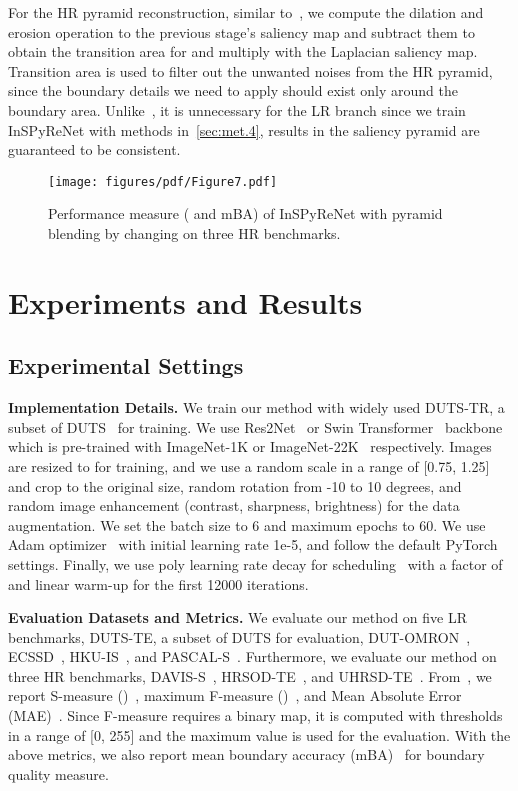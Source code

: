 \documentclass{llncs}
\begin{document}
        For the HR pyramid reconstruction, similar to~\cite{ghiasi2016laplacian}, we compute the dilation and erosion operation to the previous stage's saliency map and subtract them to obtain the transition area for and multiply with the Laplacian saliency map.
        Transition area is used to filter out the unwanted noises from the HR pyramid, since the boundary details we need to apply should exist only around the boundary area.
        Unlike~\cite{ghiasi2016laplacian}, it is unnecessary for the LR branch since we train InSPyReNet with methods in~\cref{sec:met.4}, results in the saliency pyramid are guaranteed to be consistent.
        
 
\begin{figure}
    \centering
    \texttt{[image: figures/pdf/Figure7.pdf]}
    \caption{Performance measure ( and mBA) of InSPyReNet with pyramid blending by changing  on three HR benchmarks.}
    \label{fig:7}
\end{figure} \section{Experiments and Results}
\label{sec:exp}
\subsection{Experimental Settings}
    \noindent
    \textbf{Implementation Details.} We train our method with widely used DUTS-TR, a subset of DUTS~\cite{wang2017learning} for training. 
    We use Res2Net~\cite{gao2019res2net} or Swin Transformer~\cite{liu2021swin} backbone which is pre-trained with ImageNet-1K or ImageNet-22K~\cite{russakovsky2015imagenet} respectively. 
    Images are resized to  for training, and we use a random scale in a range of [0.75, 1.25] and crop to the original size, random rotation from -10 to 10 degrees, and random image enhancement (contrast, sharpness, brightness) for the data augmentation. 
    We set the batch size to 6 and maximum epochs to 60. 
    We use Adam optimizer~\cite{kingma2014adam} with initial learning rate 1e-5, and follow the default PyTorch settings. 
    Finally, we use poly learning rate decay for scheduling~\cite{zhao2017pyramid} with a factor of  and linear warm-up for the first 12000 iterations.

    \noindent
    \textbf{Evaluation Datasets and Metrics.} We evaluate our method on five LR benchmarks, DUTS-TE, a subset of DUTS for evaluation, DUT-OMRON~\cite{yang2013saliency}, ECSSD~\cite{shi2015hierarchical}, HKU-IS~\cite{li2015visual}, and PASCAL-S~\cite{li2014secrets}.
    Furthermore, we evaluate our method on three HR benchmarks, DAVIS-S~\cite{perazzi2016benchmark}, HRSOD-TE~\cite{zeng2019towards}, and UHRSD-TE~\cite{xie2022pyramid}.
    From~\cite{wang2021salient}, we report S-measure ()~\cite{fan2017structure}, maximum F-measure ()~\cite{achanta2009frequency}, and Mean Absolute Error (MAE)~\cite{perazzi2012saliency}. 
    Since F-measure requires a binary map, it is computed with thresholds in a range of [0, 255] and the maximum value is used for the evaluation. 
    With the above metrics, we also report mean boundary accuracy (mBA)~\cite{cheng2020cascadepsp} for boundary quality measure.
    
\end{document}
